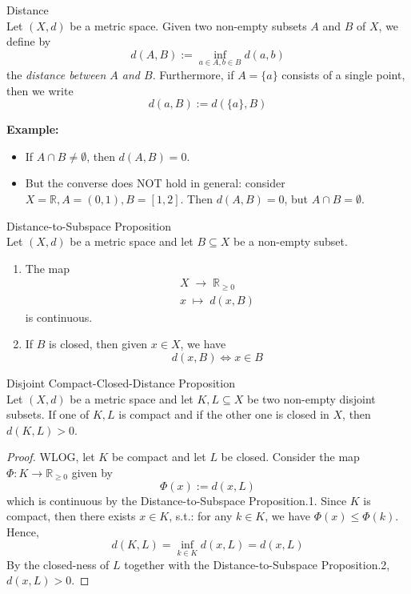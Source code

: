 \begin{definition}{Distance}\\
Let $(X,d)$ be a metric space. Given two non-empty subsets $A$ and $B$ of $X$, we define by
$$d(A,B):= \inf_{a\in A,b\in B} d(a,b)$$
the \textit{distance between $A$ and $B$}. Furthermore, if $A= \{a\}$ consists of a single point, then we write
$$d(a,B) := d(\{a\},B)$$
\end{definition}

\noindent\textbf{Example:}
\begin{itemize}
    \item If $A \cap B\neq \emptyset$, then $d(A,B)=0$.
\item But the converse does NOT hold in general: consider $X=\mathbb{R}, A=(0,1), B=[1,2]$. Then $d(A,B)=0$, but $A \cap B=\emptyset$.
\end{itemize}

\begin{proposition}{Distance-to-Subspace Proposition}\\
Let $(X,d)$ be a metric space and let $B \subseteq X$ be a non-empty subset.
\begin{enumerate}
    \item The map
    $$\substack{X \;\to\; \mathbb{R}_{\geq 0}\\
    x \;\mapsto\; d(x,B)}$$
    is continuous.

    \item If $B$ is closed, then given $x\in X$, we have
    $$d(x,B) \Leftrightarrow x\in B$$
\end{enumerate}
\end{proposition}

\begin{proposition}{Disjoint Compact-Closed-Distance Proposition}\\
Let $(X,d)$ be a metric space and let $K,L \subseteq X$ be two non-empty disjoint subsets. If one of $K,L$ is compact and if the other one is closed in $X$, then $d(K,L)>0$.
\end{proposition}

\begin{proof}
    WLOG, let $K$ be compact and let $L$ be closed. Consider the map $\Phi:K \to \mathbb{R}_{\geq 0}$ given by
    $$\Phi(x) := d(x,L)$$
    which is continuous by the Distance-to-Subspace Proposition.1. Since $K$ is compact, then there exists $x \in K$, s.t.: for any $k \in K$, we have $\Phi(x) \leq \Phi(k)$. Hence, 
    $$d(K,L) = \inf_{k \in K} d(x,L) = d(x,L)$$
    By the closed-ness of $L$ together with the Distance-to-Subspace Proposition.2, $d(x,L) >0$.
\end{proof}

